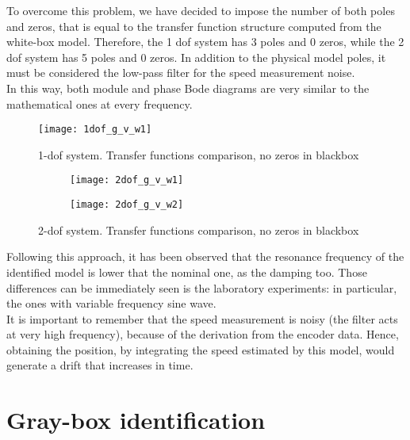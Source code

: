 To overcome this problem, we have decided to impose the number of both poles and zeros, that is equal to the transfer function structure computed from the white-box model. Therefore, the 1 dof system has 3 poles and 0 zeros, while the 2 dof system has 5 poles and 0 zeros.
In addition to the physical model poles, it must be considered the low-pass filter for the speed measurement noise. \\
In this way, both module and phase Bode diagrams are very similar to the mathematical ones at every frequency.

\begin{figure*}[h]
	\centering
	\texttt{[image: 1dof\_g\_v\_w1]}
	\caption{1-dof system. Transfer functions comparison, no zeros in blackbox}
\end{figure*}

\begin{figure*}[h]
	\centering
	\begin{subfigure}{0.45\columnwidth}
		\texttt{[image: 2dof\_g\_v\_w1]}
	\end{subfigure}
	\begin{subfigure}{0.45\columnwidth}
		\texttt{[image: 2dof\_g\_v\_w2]}
	\end{subfigure}
	\caption{2-dof system. Transfer functions comparison, no zeros in blackbox}
\end{figure*}

Following this approach, it has been observed that the resonance frequency of the identified model is lower that the nominal one, as the damping too.
Those differences can be immediately seen is the laboratory experiments: in particular, the ones with variable frequency sine wave. \\
It is important to remember that the speed measurement is noisy (the filter acts at very high frequency), because of the derivation from the encoder data. Hence, obtaining the position, by integrating the speed estimated by this model, would generate a drift that increases in time. \\


\section{Gray-box identification}

